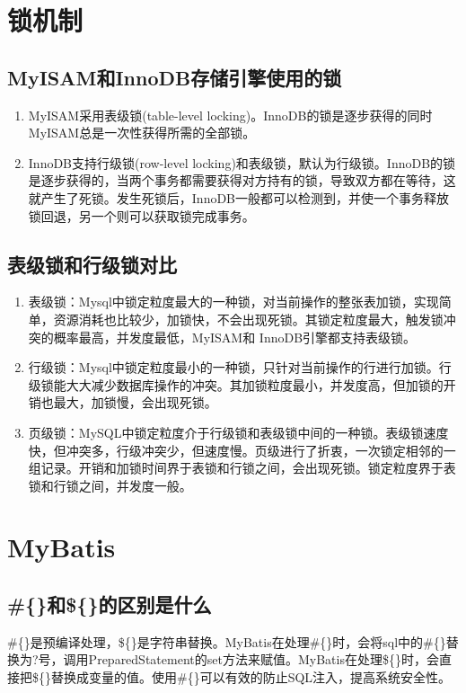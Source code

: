 \documentclass[main.tex]{subfiles}
\begin{document}
\section{锁机制}
\subsection{MyISAM和InnoDB存储引擎使用的锁}
\begin{enumerate}
    \item MyISAM采用表级锁(table-level locking)。InnoDB的锁是逐步获得的同时MyISAM总是一次性获得所需的全部锁。
    \item InnoDB支持行级锁(row-level locking)和表级锁，默认为行级锁。InnoDB的锁是逐步获得的，当两个事务都需要获得对方持有的锁，导致双方都在等待，这就产生了死锁。发生死锁后，InnoDB一般都可以检测到，并使一个事务释放锁回退，另一个则可以获取锁完成事务。
\end{enumerate}

\subsection{表级锁和行级锁对比}
\begin{enumerate}
    \item 表级锁：Mysql中锁定粒度最大的一种锁，对当前操作的整张表加锁，实现简单，资源消耗也比较少，加锁快，不会出现死锁。其锁定粒度最大，触发锁冲突的概率最高，并发度最低，MyISAM和 InnoDB引擎都支持表级锁。
    \item 行级锁：Mysql中锁定粒度最小的一种锁，只针对当前操作的行进行加锁。行级锁能大大减少数据库操作的冲突。其加锁粒度最小，并发度高，但加锁的开销也最大，加锁慢，会出现死锁。
    \item 页级锁：MySQL中锁定粒度介于行级锁和表级锁中间的一种锁。表级锁速度快，但冲突多，行级冲突少，但速度慢。页级进行了折衷，一次锁定相邻的一组记录。开销和加锁时间界于表锁和行锁之间，会出现死锁。锁定粒度界于表锁和行锁之间，并发度一般。
\end{enumerate}

\section{MyBatis}
\subsection{\#\{\}和\$\{\}的区别是什么}
\#\{\}是预编译处理，\$\{\}是字符串替换。MyBatis在处理\#\{\}时，会将sql中的\#\{\}替换为?号，调用PreparedStatement的set方法来赋值。MyBatis在处理\$\{\}时，会直接把\$\{\}替换成变量的值。使用\#\{\}可以有效的防止SQL注入，提高系统安全性。
\end{document}
